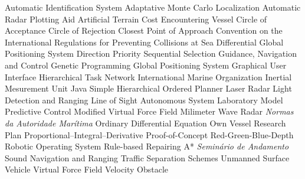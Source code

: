 \begin{acronym}
      {Automatic Identification System}
     {Adaptative Monte Carlo Localization}
     {Automatic Radar Plotting Aid}
      {Artificial Terrain Cost}
       {Encountering Vessel}
      {Circle of Acceptance}
      {Circle of Rejection}
      {Closest Point of Approach}
  {Convention on the International Regulations for Preventing Collisions at Sea}
     {Differential Global Positioning System}
     {Direction Priority Sequential Selection}
      {Guidance, Navigation and Control}
       {Genetic Programming}
      {Global Positioning System}
      {Graphical User Interface}
      {Hierarchical Task Network}
      {International Marine Organization}
      {Inertial Mesurement Unit}
    {Java Simple Hierarchical Ordered Planner}
    {Laser Radar}
    {Light Detection and Ranging}
      {Line of Sight}
      {Autonomous System Laboratory}
      {Model Predictive Control}
     {Modified Virtual Force Field}
      {Milimeter Wave Radar}
   {\textit{Normas da Autoridade Marítima}}
      {Ordinary Differential Equation}
       {Own Vessel}
      {Research Plan}
      {Proportional–Integral–Derivative}
      {Proof-of-Concept}
     {Red-Green-Blue-Depth}
      {Robotic Operating System}
    {Rule-based Repairing A*}
       {\textit{Seminário de Andamento}}
    {Sound Navigation and Ranging}
      {Traffic Separation Schemes}
      {Unmanned Surface Vehicle}
      {Virtual Force Field}
       {Velocity Obstacle}
\end{acronym}